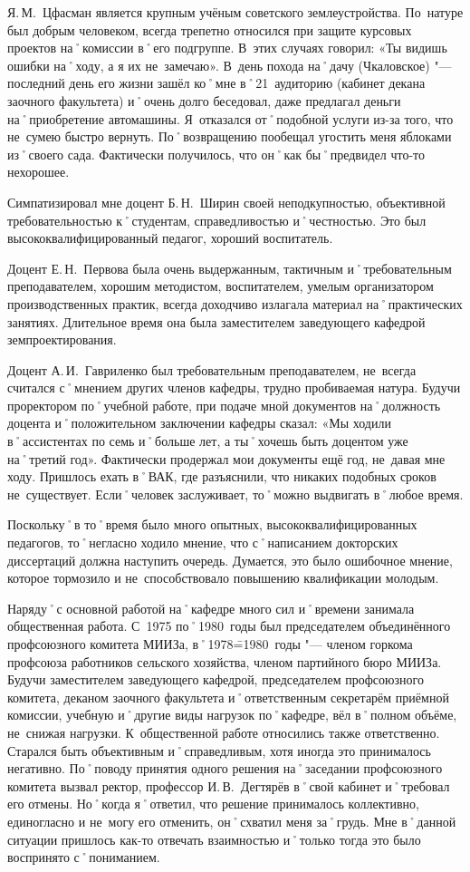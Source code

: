 Я.\,М.~Цфасман является крупным учёным советского землеустройства. По~натуре был добрым человеком, всегда трепетно относился при защите курсовых проектов на˚комиссии в˚его подгруппе. В~этих случаях говорил: «Ты видишь ошибки на˚ходу, а я их не~замечаю». В~день похода на˚дачу (Чкаловское) "--- последний день его жизни зашёл ко˚мне в˚21~аудиторию (кабинет декана заочного факультета) и˚очень долго беседовал, даже предлагал деньги на˚приобретение автомашины. Я~отказался от˚подобной услуги из-за того, что не~сумею быстро вернуть. По˚возвращению пообещал угостить меня яблоками из˚своего сада. Фактически получилось, что он˚как бы˚предвидел что-то нехорошее.

Симпатизировал мне доцент Б.\,Н.~Ширин своей неподкупностью, объективной требовательностью к˚студентам, справедливостью и˚честностью. Это был высококвалифицированный педагог, хороший воспитатель.

Доцент Е.\,Н.~Первова была очень выдержанным, тактичным и˚требовательным преподавателем, хорошим методистом, воспитателем, умелым организатором производственных практик, всегда доходчиво излагала материал на˚практических занятиях. Длительное время она была заместителем заведующего кафедрой земпроектирования.

Доцент А.\,И.~Гавриленко был требовательным преподавателем, не~всегда считался с˚мнением других членов кафедры, трудно пробиваемая натура. Будучи проректором по˚учебной работе, при подаче мной документов на˚должность доцента и˚положительном заключении кафедры сказал: «Мы ходили в˚ассистентах по семь и˚больше лет, а ты˚хочешь быть доцентом уже на˚третий год». Фактически продержал мои документы ещё год, не~давая мне ходу. Пришлось ехать в˚ВАК, где разъяснили, что никаких подобных сроков не~существует. Если˚человек заслуживает, то˚можно выдвигать в˚любое время.

Поскольку˚в то˚время было много опытных, высококвалифицированных педагогов, то˚негласно ходило мнение, что с˚написанием докторских диссертаций должна наступить очередь. Думается, это было ошибочное мнение, которое тормозило и не~способствовало повышению квалификации молодым.

Наряду˚с основной работой на˚кафедре много сил и˚времени занимала общественная работа. С~1975 по˚1980~годы был председателем объединённого профсоюзного комитета МИИЗа, в˚1978\==1980~годы "--- членом горкома профсоюза работников сельского хозяйства, членом партийного бюро МИИЗа. Будучи заместителем заведующего кафедрой, председателем профсоюзного комитета, деканом заочного факультета и˚ответственным секретарём приёмной комиссии, учебную и˚другие виды нагрузок по˚кафедре, вёл в˚полном объёме, не~снижая нагрузки. К~общественной работе относились также ответственно. Старался быть объективным и˚справедливым, хотя иногда это принималось негативно. По˚поводу принятия одного решения на˚заседании профсоюзного комитета вызвал ректор, профессор И.\,В.~Дегтярёв в˚свой кабинет и˚требовал его отмены. Но˚когда я˚ответил, что решение принималось коллективно, единогласно и не~могу его отменить, он˚схватил меня за˚грудь. Мне в˚данной ситуации пришлось как-то отвечать взаимностью и˚только тогда это было воспринято с˚пониманием.

